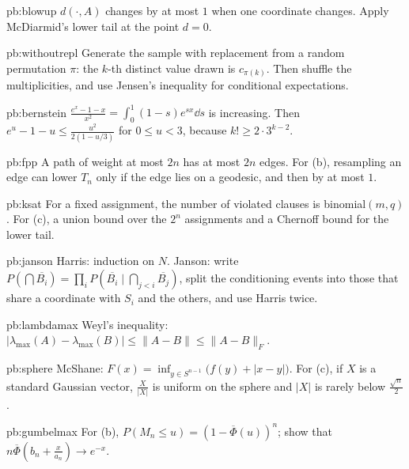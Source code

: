\begin{hint}{pb:blowup}
$d(\cdot,A)$ changes by at most $1$ when one coordinate changes. Apply McDiarmid's lower tail at the point $d=0$.
\end{hint}

\begin{hint}{pb:withoutrepl}
Generate the sample with replacement from a random permutation $\pi$: the $k$-th distinct value drawn is $c_{\pi(k)}$. Then shuffle the multiplicities, and use Jensen's
inequality for conditional expectations.
\end{hint}

\begin{hint}{pb:bernstein}
$\frac{e^x-1-x}{x^2}=\int_0^1(1-s)e^{sx}\dd s$ is increasing. Then $e^u-1-u\le\frac{u^2}{2(1-u/3)}$ for $0\le u<3$, because $k!\ge2\cdot3^{k-2}$.
\end{hint}

\begin{hint}{pb:fpp}
A path of weight at most $2n$ has at most $2n$ edges. For (b), resampling an edge can lower $T_n$ only if the edge lies on a geodesic, and then by at most $1$.
\end{hint}

\begin{hint}{pb:ksat}
For a fixed assignment, the number of violated clauses is binomial$(m,q)$. For (c), a union bound over the $2^n$ assignments and a Chernoff bound for the lower tail.
\end{hint}

\begin{hint}{pb:janson}
Harris: induction on $N$. Janson: write $P(\bigcap\overline{B_i})=\prod_iP(\overline{B_i}\mid\bigcap_{j<i}\overline{B_j})$, split the conditioning events into those that share a coordinate
with $S_i$ and the others, and use Harris twice.
\end{hint}

\begin{hint}{pb:lambdamax}
Weyl's inequality: $|\lambda_{\max}(A)-\lambda_{\max}(B)|\le\|A-B\|\le\|A-B\|_F$.
\end{hint}

\begin{hint}{pb:sphere}
McShane: $F(x)=\inf_{y\in S^{n-1}}\bigl(f(y)+|x-y|\bigr)$. For (c), if $X$ is a standard Gaussian vector, $\frac X{|X|}$ is uniform on the sphere and $|X|$ is rarely below $\frac{\sqrt n}2$.
\end{hint}

\begin{hint}{pb:gumbelmax}
For (b), $P(M_n\le u)=(1-\overline\Phi(u))^n$; show that $n\overline\Phi(b_n+\frac x{a_n})\to e^{-x}$.
\end{hint}

